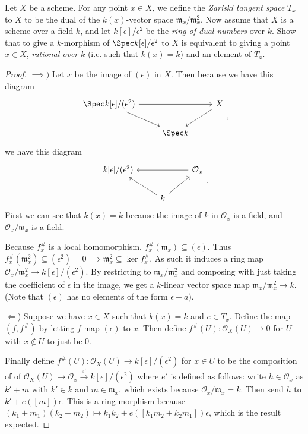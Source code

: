 \begin{exercise}%
	Let $X$	be a scheme. For any point $x\in X $, we define the \textit{Zariski tangent space} $T_x $ to $X $ to be the dual of the $k(x) $-vector space $\mathfrak{m}_x / \mathfrak{m}_x^2 $. Now assume that $X $ is a scheme over a field $k $, and let $k[\epsilon] / \epsilon^2$ be the \textit{ring of dual numbers} over $k $. Show that to give a $k $-morphism of $\Spec k[\epsilon] / \epsilon^2 $ to $X $ is equivalent to giving a point $x\in X $, \textit{rational over} $k $ (i.e. such that $k(x) = k $) and an element of $T_x $.
\end{exercise}
\begin{proof}
	$\implies) $
	Let $x $ be the image of $(\epsilon) $ in $X $.
	Then because we have this diagram
	\[
	\begin{tikzcd}
		\Spec k[\epsilon]/(\epsilon^2) & & X\\
	 & \Spec k &
	\arrow[from=1-1,to=1-3]
	\arrow[from=1-1,to=2-2]
	\arrow[from=1-3,to=2-2]
	\end{tikzcd},
	\]
	we have this diagram
	\[
	\begin{tikzcd}
		k[\epsilon] / (\epsilon^2) & & \mathcal{O}_x\\
	 & k &
	\arrow[from=1-3,to=1-1]
	\arrow[from=2-2,to=1-1]
	\arrow[from=2-2,to=1-3]
	\end{tikzcd}.
	\]
	First we can see that $k(x) = k $ because the image of $k $ in $\mathcal{O}_x $ is a field, and $\mathcal{O}_x / \mathfrak{m}_x $ is a field.

	Because $f^\#_x $ is a local homomorphism, $f^\#_x(\mathfrak{m}_x) \subseteq (\epsilon) $.
	Thus $f^\#_x(\mathfrak{m}_x^2) \subseteq (\epsilon^2) = 0 \implies \mathfrak{m}_x^2 \subseteq \ker f^\#_x $.
	As such it induces a ring map $\mathcal{O}_x / \mathfrak{m}^2_x \to k[\epsilon] / (\epsilon^2)$.
	By restricting to $\mathfrak{m}_x / \mathfrak{m}_x^2 $ and composing with just taking the coefficient of $\epsilon $ in the image, we get a $k $-linear vector space map $\mathfrak{m}_x / \mathfrak{m}_x^2 \to k $.
	(Note that $(\epsilon) $ has no elements of the form $\epsilon+a $).

	$\Leftarrow $) Suppose we have $x \in X $ such that $k(x) = k $ and $e \in T_x $.
	Define the map $(f,f^\#) $ by letting $f $ map $(\epsilon) $ to $x $.
	Then define $f^\#(U): \mathcal{O}_X(U) \to 0$ for $U$ with $x\notin U $ to just be 0.

	Finally define $f^\#(U): \mathcal{O}_X(U) \to k[\epsilon] / (\epsilon^2) $ for $x\in U $ to be the composition of of $\mathcal{O}_X(U) \to \mathcal{O}_x \xrightarrow{e'} k[\epsilon] / (\epsilon^2)$ where $e' $ is defined as follows:
	write $h \in \mathcal{O}_x $ as $k' + m $ with $k' \in k $ and $m \in \mathfrak{m}_x $, which exists because $\mathcal{O}_x / \mathfrak{m}_x = k $.
	Then send $h $ to $k' + e([m])\epsilon$.
	This is a ring morphism because $(k_{1}+m_{1})(k_{2}+m_{2}) \mapsto k_{1}k_{2} + e([k_{1}m_{2}+k_{2}m_{1}])\epsilon $, which is the result expected.
\end{proof}

